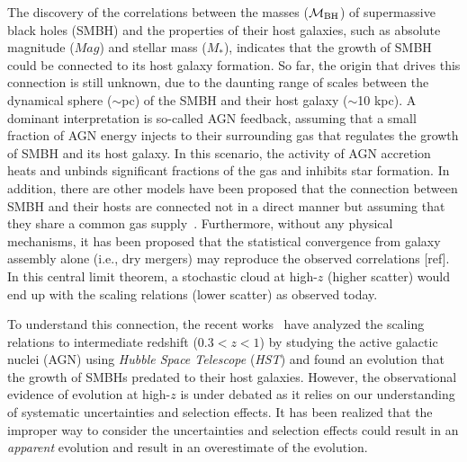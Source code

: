 \documentclass{natureprintstyle}
\newcommand{\mbh}{$\mathcal M_{\rm BH}$}
\newcommand{\mstar}{{$M_*$}}
\begin{document}
The discovery of the correlations between the masses (\mbh) of supermassive black holes (SMBH) and the properties of their host galaxies, such as absolute magnitude ($Mag$) and stellar mass (\mstar), indicates that the growth of SMBH could be connected to its host galaxy formation. So far, the origin that drives this connection is still unknown, due to the daunting range of scales between the dynamical sphere ($\sim$pc) of the SMBH and their host galaxy ($\sim$10 kpc). A dominant interpretation is so-called AGN feedback, assuming that a small fraction of AGN energy injects to their surrounding gas that regulates the growth of SMBH and its host galaxy. In this scenario, the activity of AGN accretion heats and unbinds significant fractions of the gas and inhibits star formation. In addition, there are other models have been proposed that the connection between SMBH and their hosts are connected not in a direct manner but assuming that they share a common gas supply~\cite{Cen2015, Menci2016}. Furthermore, without any physical mechanisms, it has been proposed that the statistical convergence from galaxy assembly alone (i.e., dry mergers) may reproduce the observed correlations [ref]. In this central limit theorem, a stochastic cloud at high-$z$ (higher scatter) would end up with the scaling relations (lower scatter) as observed today.

To understand this connection, the recent works~\cite{Park15, Tre++07, Bennert11, Woo++08} have analyzed the scaling relations to intermediate redshift {($0.3<z<1$)} by studying the active galactic nuclei (AGN) using {\it Hubble Space Telescope} ({\it HST}) and found an evolution that the growth of SMBHs predated to their host galaxies. However, the observational evidence of evolution at high-$z$ is under debated as it relies on our understanding of systematic uncertainties and selection effects. It has been realized that the improper way to consider the uncertainties and selection effects could result in an {\it apparent} evolution and result in an overestimate of the evolution\cite{Volonteri2011}.
\end{document}
